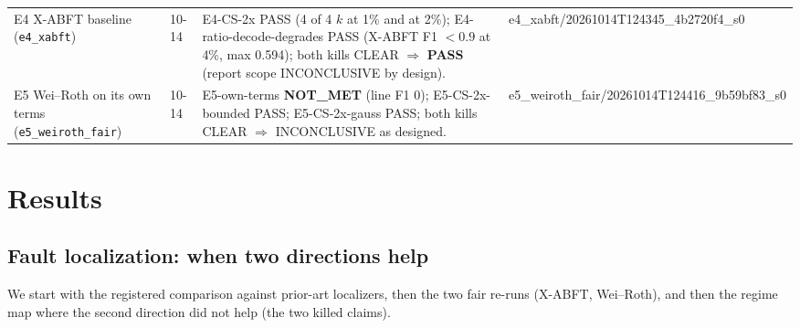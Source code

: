 \documentclass[journal]{IEEEtran}
\begin{document}
\begin{table}[t]
\begin{tabular}{p{2.6cm}p{1.5cm}p{9.2cm}p{2.9cm}}
E4 X-ABFT baseline (\texttt{e4\_xabft}) & 10-14 & E4-CS-2x PASS (4 of 4 $k$ at 1\% and at 2\%); E4-ratio-decode-degrades PASS (X-ABFT F1 $<0.9$ at 4\%, max 0.594); both kills CLEAR $\Rightarrow$ \textbf{PASS} (report scope INCONCLUSIVE by design).
 & e4\_xabft/\allowbreak 20261014T124345\_4b2720f4\_s0 \\
E5 Wei--Roth on its own terms (\texttt{e5\_weiroth\_fair}) & 10-14 & E5-own-terms \textbf{NOT\_MET} (line F1 0); E5-CS-2x-bounded PASS; E5-CS-2x-gauss PASS; both kills CLEAR $\Rightarrow$ INCONCLUSIVE as designed.
 & e5\_weiroth\_fair/\allowbreak 20261014T124416\_9b59bf83\_s0 \\
\bottomrule
\end{tabular}
\end{table}

\section{Results}
\label{sec:results}
\subsection{Fault localization: when two directions help}
\label{sec:results-b}
We start with the registered comparison against prior-art localizers, then the two fair re-runs (X-ABFT, Wei--Roth), and then the regime map where the second direction did not help (the two killed claims).
\end{document}
